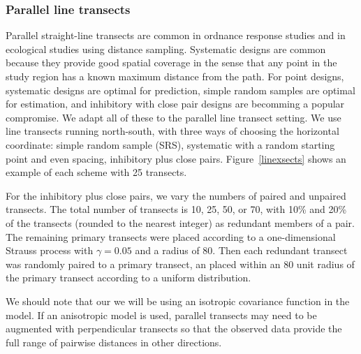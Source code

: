 \documentclass[review]{elsarticle}
\begin{document}
\subsubsection{Parallel line transects}

Parallel straight-line transects are common in ordnance response studies and in
ecological studies using distance sampling. Systematic designs are common
because they provide good spatial coverage in the sense that any point in the
study region has a known maximum distance from the path. For point designs,
systematic designs are optimal for prediction, simple random samples are
optimal for estimation, and inhibitory with close pair designs are becomming a
popular compromise. We adapt all of these to the parallel line transect
setting. We use line transects running north-south, with three ways of choosing
the horizontal coordinate: simple random sample (SRS), systematic with a random
starting point and even spacing, inhibitory plus close pairs.
Figure~\ref{linexsects} shows an example of each scheme with 25 transects.

For the inhibitory plus close pairs, we vary the numbers of paired and unpaired
transects. The total number of transects is 10, 25, 50, or 70, with 10\% and
20\% of the transects (rounded to the nearest integer) as redundant members of
a pair. The remaining primary transects were placed according to a
one-dimensional Strauss process with \(\gamma = 0.05\) and a radius of 80. Then
each redundant transect was randomly paired to a primary transect, an placed
within an 80 unit radius of the primary transect according to a uniform
distribution.

We should note that our we will be using an isotropic covariance function in
the model. If an anisotropic model is used, parallel transects may need to be
augmented with perpendicular transects so that the observed data provide the
full range of pairwise distances in other directions.
\end{document}
